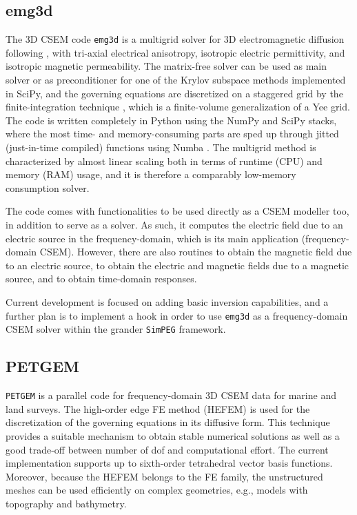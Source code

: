 \documentclass[
    paper,
  ]{geophysics}
\newcommand{\emg}[2]{\texttt{emg#1#2}\xspace}
\newcommand{\simpeg}{\texttt{SimPEG}\xspace}
\newcommand{\petgem}{\texttt{PETGEM}\xspace}
\begin{document}
\subsection{emg3d}

The 3D CSEM code \emg3d is a multigrid \citep{CMMP.64.Fedorenko} solver for 3D electromagnetic diffusion following \cite{GP.06.Mulder}, with tri-axial electrical anisotropy, isotropic electric permittivity, and isotropic magnetic permeability. The matrix-free solver can be used as main solver or as preconditioner for one of the Krylov subspace methods implemented in SciPy, and the governing equations are discretized on a staggered grid by the finite-integration technique \citep{AEU.77.Weiland}, which is a finite-volume generalization of a Yee grid. The code is written completely in Python using the NumPy and SciPy stacks, where the most time- and memory-consuming parts are sped up through jitted (just-in-time compiled) functions using Numba \citep{LLVM.15.Lam}. The multigrid method is characterized by almost linear scaling both in terms of runtime (CPU) and memory (RAM) usage, and it is therefore a comparably low-memory consumption solver.

The code comes with functionalities to be used directly as a CSEM modeller too, in addition to serve as a solver. As such, it computes the electric field due to an electric source in the frequency-domain, which is its main application (frequency-domain CSEM). However, there are also routines to obtain the magnetic field due to an electric source, to obtain the electric and magnetic fields due to a magnetic source, and to obtain time-domain responses.

Current development is focused on adding basic inversion capabilities, and a further plan is to implement a hook in order to use \emg3d as a frequency-domain CSEM solver within the grander \simpeg framework.

\subsection{PETGEM}

\petgem is a parallel code for frequency-domain 3D CSEM data for marine and land surveys. The high-order edge FE method (HEFEM) is used for the discretization of the governing equations in its diffusive form. This technique provides a suitable mechanism to obtain stable numerical solutions as well as a good trade-off between number of dof and computational effort. The current implementation supports up to sixth-order tetrahedral vector basis functions. Moreover, because the HEFEM belongs to the FE family, the unstructured meshes can be used efficiently on complex geometries, e.g., models with topography and bathymetry.
\end{document}
